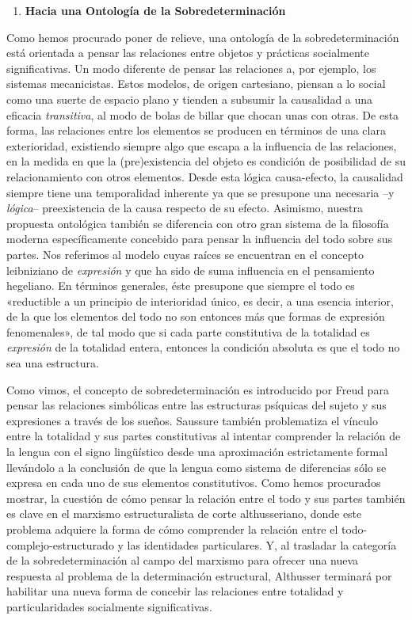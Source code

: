 \begin{enumerate}
\def\labelenumi{\arabic{enumi}.}
\item
  \textbf{Hacia una Ontología de la Sobredeterminación}
\end{enumerate}

Como hemos procurado poner de relieve, una ontología de la sobredeterminación está orientada a pensar las relaciones entre objetos y prácticas socialmente significativas. Un modo diferente de pensar las relaciones a, por ejemplo, los sistemas mecanicistas. Estos modelos, de origen cartesiano, piensan a lo social como una suerte de espacio plano y tienden a subsumir la causalidad a una eficacia \emph{transitiva}, al modo de bolas de billar que chocan unas con otras. De esta forma, las relaciones entre los elementos se producen en términos de una clara exterioridad, existiendo siempre algo que escapa a la influencia de las relaciones, en la medida en que la (pre)existencia del objeto es condición de posibilidad de su relacionamiento con otros elementos. Desde esta lógica causa-efecto, la causalidad siempre tiene una temporalidad inherente ya que se presupone una necesaria --y \emph{lógica}-- preexistencia de la causa respecto de su efecto. Asimismo, nuestra propuesta ontológica también se diferencia con otro gran sistema de la filosofía moderna específicamente concebido para pensar la influencia del todo sobre sus partes. Nos referimos al modelo cuyas raíces se encuentran en el concepto leibniziano de \emph{expresión} y que ha sido de suma influencia en el pensamiento hegeliano. En términos generales, éste presupone que siempre el todo es «reductible a un principio de interioridad único, es decir, a una esencia interior, de la que los elementos del todo no son entonces más que formas de expresión fenomenales», de tal modo que si cada parte constitutiva de la totalidad es \emph{expresión} de la totalidad entera, entonces la condición absoluta es que el todo no sea una estructura.

Como vimos, el concepto de sobredeterminación es introducido por Freud para pensar las relaciones simbólicas entre las estructuras psíquicas del sujeto y sus expresiones a través de los sueños. Saussure también problematiza el vínculo entre la totalidad y sus partes constitutivas al intentar comprender la relación de la lengua con el signo lingüístico desde una aproximación estrictamente formal llevándolo a la conclusión de que la lengua como sistema de diferencias sólo se expresa en cada uno de sus elementos constitutivos. Como hemos procurados mostrar, la cuestión de cómo pensar la relación entre el todo y sus partes también es clave en el marxismo estructuralista de corte althusseriano, donde este problema adquiere la forma de cómo comprender la relación entre el todo-complejo-estructurado y las identidades particulares. Y, al trasladar la categoría de la sobredeterminación al campo del marxismo para ofrecer una nueva respuesta al problema de la determinación estructural, Althusser terminará por habilitar una nueva forma de concebir las relaciones entre totalidad y particularidades socialmente significativas.

